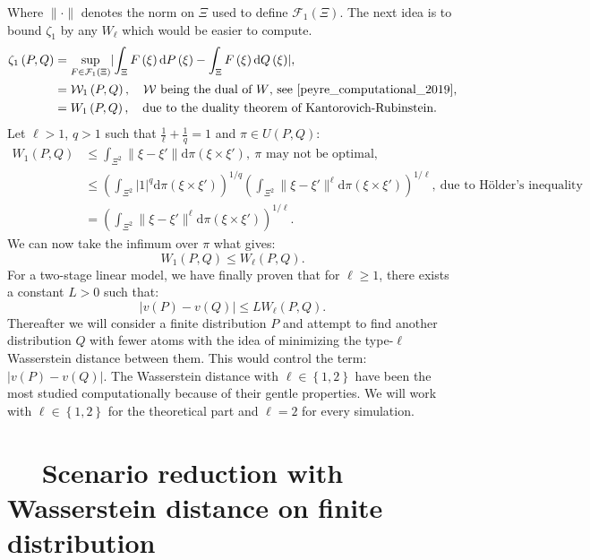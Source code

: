 \documentclass{amsart}
\begin{document}
Where $\lVert \cdot \rVert$ denotes the norm on $\Xi$ used to define $\mathcal{F}_1\left(\Xi\right)$. The next idea is to bound $\zeta_1$ by any $W_\ell$ which would be easier to compute.
\begin{align*}
    \zeta_1\left(P,Q\right)&= \sup_{F\in\mathcal{F}_1\left(\Xi\right)}\lvert \int_\Xi F\left(\xi\right)\text{d}P\left(\xi\right)-\int_\Xi F\left(\xi\right)\text{d}Q\left(\xi\right)\rvert, \\
    &=\mathcal{W}_1\left(P,Q\right), \quad \mathcal{W} \text{ being the dual of } W \text{, see \cite[Chapter 6]{peyre_computational_2019},}\\
    &= W_1\left(P,Q\right), \quad \text{due to the duality theorem of Kantorovich-Rubinstein.}
\end{align*}
Let $\ell >1$, $q>1$ such that $\frac{1}{\ell}+\frac{1}{q}=1$ and $\pi\in U\left(P,Q\right)$:
\begin{align*}
W_1\left(P,Q\right)&\leq \int_{\Xi^2}\lVert \xi-\xi'\rVert \text{d}\pi\left(\xi\times\xi'\right),\: \pi \text{ may not be optimal,} \\ &\leq \left(\int_{\Xi^2} \lvert 1\rvert^{q}\text{d}\pi\left(\xi\times\xi'\right)\right)^{1/q} \left(\int_{\Xi^2}\lVert \xi-\xi'\rVert^\ell\text{d}\pi\left(\xi\times\xi'\right)\right)^{1/\ell}, \: \text{due to Hölder's inequality} \\
&=\left(\int_{\Xi^2}\lVert \xi-\xi'\rVert^\ell\text{d}\pi\left(\xi\times\xi'\right)\right)^{1/\ell}.
\end{align*}
We can now take the infimum over $\pi$ what gives:
$$
W_1\left(P,Q\right)\leq W_\ell\left(P,Q\right).
$$
For a two-stage linear model, we have finally proven that for $\ell\geq1$, there exists a constant $L>0$ such that:
$$
\lvert v\left(P\right)-v\left(Q\right)\rvert \leq LW_\ell\left(P,Q\right).
$$
Thereafter we will consider a finite distribution $P$ and attempt to find another distribution $Q$ with fewer atoms with the idea of minimizing the type-$\ell$ Wasserstein distance between them. This would control the term: $\lvert v\left(P\right)-v\left(Q\right)\rvert$. The Wasserstein distance with $\ell\in\left\{1,2\right\}$ have been the most studied computationally because of their gentle properties. We will work with $\ell\in\left\{1,2\right\}$ for the theoretical part and $\ell=2$ for every simulation.

\section{$\quad$ Scenario reduction with Wasserstein distance on finite distribution}
\end{document}
